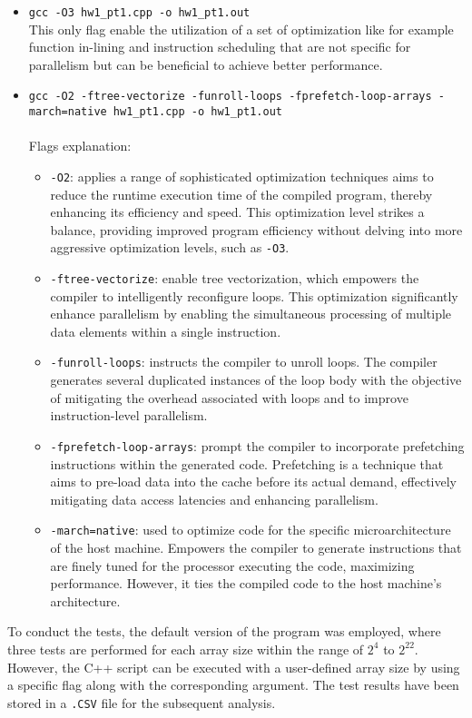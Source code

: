 \documentclass{article}
\begin{document}
\begin{itemize}
  \item \texttt{gcc -O3 hw1\_pt1.cpp -o hw1\_pt1.out}\\
  This only flag enable the utilization of a set of optimization like for example function in-lining and instruction scheduling that are not specific for parallelism but can be beneficial to achieve better performance.
  \item \texttt{gcc -O2 -ftree-vectorize -funroll-loops -fprefetch-loop-arrays -march=native hw1\_pt1.cpp -o hw1\_pt1.out}\\\\
  Flags explanation:
    \begin{itemize}
        \item[] \texttt{-O2}: applies a range of sophisticated optimization techniques aims to reduce the runtime execution time of the compiled program, thereby enhancing its efficiency and speed. 
        This optimization level strikes a balance, providing improved program efficiency without delving into more aggressive optimization levels, such as \texttt{-O3}.
        \item[] \texttt{-ftree-vectorize}: enable tree vectorization, which empowers the compiler to intelligently reconfigure loops. This optimization significantly enhance parallelism by enabling the simultaneous processing of multiple data elements within a single instruction.
        \item[] \texttt{-funroll-loops}: instructs the compiler to unroll loops. The compiler generates several duplicated instances of the loop body with the objective of mitigating the overhead associated with loops and to improve instruction-level parallelism.
        \item[] \texttt{-fprefetch-loop-arrays}: prompt the compiler to incorporate prefetching instructions within the generated code. Prefetching is a technique that aims to pre-load data into the cache before its actual demand, effectively mitigating data access latencies and enhancing parallelism.
        \item[] \texttt{-march=native}: used to optimize code for the specific microarchitecture of the host machine. Empowers the compiler to generate instructions that are finely tuned for the processor executing the code, maximizing performance. However, it ties the compiled code to the host machine's architecture.
    \end{itemize}
\end{itemize}
To conduct the tests, the default version of the program was employed, where three tests are performed for each array size within the range of $2^4$ to $2^{22}$. However, the C++ script can be executed with a user-defined array size by using a specific flag along with the corresponding argument. The test results have been stored in a \texttt{.CSV} file for the subsequent analysis. 
\end{document}
